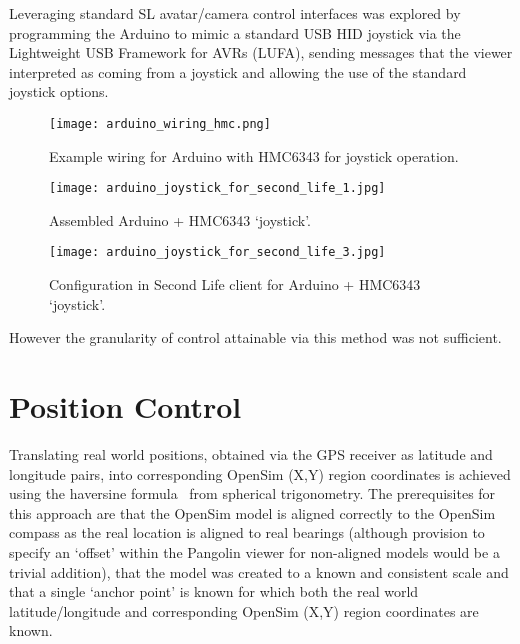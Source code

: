 Leveraging standard SL avatar/camera control interfaces was explored by programming the Arduino to mimic a standard USB HID joystick via the Lightweight USB Framework for AVRs (LUFA), sending messages that the viewer interpreted as coming from a joystick and allowing the use of the standard joystick options.

\begin{figure}[h]
\centering
  \texttt{[image: arduino\_wiring\_hmc.png]}
  \caption{Example wiring for Arduino with HMC6343 for joystick operation.}
  \label{arduino_wiring_hmc.png}
\end{figure}

\begin{figure}[h]
\centering
  \texttt{[image: arduino\_joystick\_for\_second\_life\_1.jpg]}
  \caption{Assembled Arduino + HMC6343 `joystick'.}
  \label{arduino_joystick_for_second_life_1.jpg}
\end{figure}

\begin{figure}[h]
\centering
  \texttt{[image: arduino\_joystick\_for\_second\_life\_3.jpg]}
  \caption{Configuration in Second Life client for Arduino + HMC6343 `joystick'.}
  \label{arduino_joystick_for_second_life_3.jpg}
\end{figure}

However the granularity of control attainable via this method was not sufficient.


\section{Position Control}

Translating real world positions, obtained via the GPS receiver as latitude and longitude pairs, into corresponding OpenSim (X,Y) region coordinates is achieved using the haversine formula~\cite{Gellert1989} from spherical trigonometry. The prerequisites for this approach are that the OpenSim model is aligned correctly to the OpenSim compass as the real location is aligned to real bearings (although provision to specify an `offset' within the Pangolin viewer for non-aligned models would be a trivial addition), that the model was created to a known and consistent scale and that a single `anchor point' is known for which both the real world latitude/longitude and corresponding OpenSim (X,Y) region coordinates are known.

